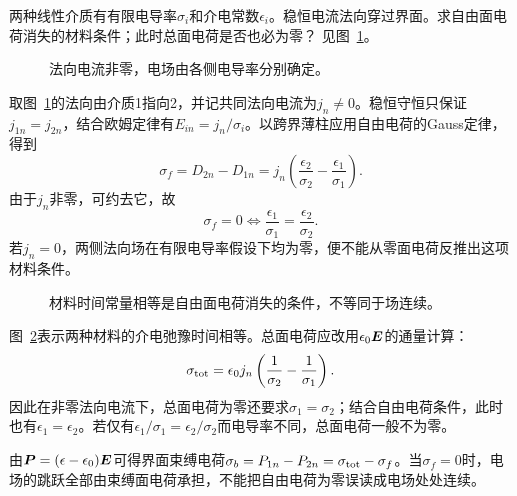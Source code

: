 \begin{exercise}[导电界面上的自由面电荷为零的条件]\label{ex:c1-h4}
两种线性介质有有限电导率$\sigma_i$和介电常数$\epsilon_i$。稳恒电流法向穿过界面。求自由面电荷消失的材料条件；此时总面电荷是否也必为零？ 见图~\ref{fig:c1-h4-q}。
\end{exercise}

\begin{figure}[H]\centering
{}
\caption{法向电流非零，电场由各侧电导率分别确定。}\label{fig:c1-h4-q}
\end{figure}
\begin{solution}
取图~\ref{fig:c1-h4-q}的法向由介质1指向2，并记共同法向电流为$j_n\ne0$。稳恒守恒只保证$j_{1n}=j_{2n}$，结合欧姆定律有$E_{in}=j_n/\sigma_i$。以跨界薄柱应用自由电荷的Gauss定律，得到
\[
 \sigma_f=D_{2n}-D_{1n}
 =j_n\left(\frac{\epsilon_2}{\sigma_2}-\frac{\epsilon_1}{\sigma_1}\right).
\]
由于$j_n$非零，可约去它，故
\[
 \boxed{\sigma_f=0\iff\frac{\epsilon_1}{\sigma_1}
 =\frac{\epsilon_2}{\sigma_2}}.
\]
若$j_n=0$，两侧法向场在有限电导率假设下均为零，便不能从零面电荷反推出这项材料条件。
\begin{figure}[H]\centering
{}
\caption{材料时间常量相等是自由面电荷消失的条件，不等同于场连续。}\label{fig:c1-h4-s}
\end{figure}
图~\ref{fig:c1-h4-s}表示两种材料的介电弛豫时间相等。总面电荷应改用$\epsilon_0\bm{E}$的通量计算：
\[
 \sigma_{\rm tot}=\epsilon_0j_n\left(\frac1{\sigma_2}-\frac1{\sigma_1}\right).
\]
因此在非零法向电流下，总面电荷为零还要求$\sigma_1=\sigma_2$；结合自由电荷条件，此时也有$\epsilon_1=\epsilon_2$。若仅有$\epsilon_1/\sigma_1=\epsilon_2/\sigma_2$而电导率不同，总面电荷一般不为零。

由$\bm{P}=(\epsilon-\epsilon_0)\bm{E}$可得界面束缚电荷$\sigma_b=P_{1n}-P_{2n}=\sigma_{\rm tot}-\sigma_f$。当$\sigma_f=0$时，电场的跳跃全部由束缚面电荷承担，不能把自由电荷为零误读成电场处处连续。
\end{solution}

